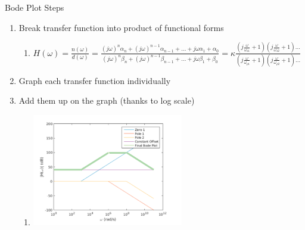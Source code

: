     \begin{frame}{Bode Plot Steps}
        \begin{enumerate}
            \item Break transfer function into product of functional forms
            \begin{enumerate}
                \item $H(\omega) = \frac{n(\omega)}{d(\omega)} = \frac{(j\omega)^n\alpha_{n} + (j\omega)^{n-1}\alpha_{n-1} + \ldots  + j \omega \alpha_1 + \alpha_0}{(j\omega)^n\beta_{n} + (j\omega)^{n-1}\beta_{n-1} + \ldots  + j \omega \beta_1 + \beta_0} = \kappa \frac{(j\frac{\omega}{\omega_{z1}} +1)(j\frac{\omega}{\omega_{z2}} +1) \ldots}{(j\frac{\omega}{\omega_{\rho1}} +1)(j\frac{\omega}{\omega_{\rho2}} +1) \ldots}$
            \end{enumerate}
            \item Graph each transfer function individually
            \item Add them up on the graph (thanks to log scale)
            \begin{enumerate}
                \item \includegraphics[scale=0.5]{./images/bode-plot-steps-1.png}
            \end{enumerate}
        \end{enumerate}
    \end{frame}
